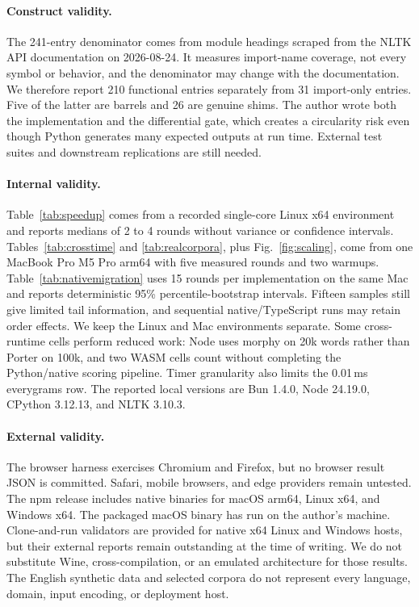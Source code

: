 \documentclass[pdflatex,sn-mathphys-num]{sn-jnl}
\theoremstyle{thmstyleone}
\begin{document}
\paragraph{Construct validity.}
The 241-entry denominator comes from module headings scraped from the NLTK API documentation on 2026-08-24. It measures import-name coverage, not every symbol or behavior, and the denominator may change with the documentation. We therefore report 210 functional entries separately from 31 import-only entries. Five of the latter are barrels and 26 are genuine shims. The author wrote both the implementation and the differential gate, which creates a circularity risk even though Python generates many expected outputs at run time. External test suites and downstream replications are still needed.

\paragraph{Internal validity.}
Table~\ref{tab:speedup} comes from a recorded single-core Linux x64 environment and reports medians of 2 to 4 rounds without variance or confidence intervals. Tables~\ref{tab:crosstime} and \ref{tab:realcorpora}, plus Fig.~\ref{fig:scaling}, come from one MacBook Pro M5 Pro arm64 with five measured rounds and two warmups. Table~\ref{tab:nativemigration} uses 15 rounds per implementation on the same Mac and reports deterministic 95\% percentile-bootstrap intervals. Fifteen samples still give limited tail information, and sequential native/TypeScript runs may retain order effects. We keep the Linux and Mac environments separate. Some cross-runtime cells perform reduced work: Node uses morphy on 20k words rather than Porter on 100k, and two WASM cells count without completing the Python/native scoring pipeline. Timer granularity also limits the 0.01\,ms everygrams row. The reported local versions are Bun 1.4.0, Node 24.19.0, CPython 3.12.13, and NLTK 3.10.3.

\paragraph{External validity.}
The browser harness exercises Chromium and Firefox, but no browser result JSON is committed. Safari, mobile browsers, and edge providers remain untested. The npm release includes native binaries for macOS arm64, Linux x64, and Windows x64. The packaged macOS binary has run on the author's machine. Clone-and-run validators are provided for native x64 Linux and Windows hosts, but their external reports remain outstanding at the time of writing. We do not substitute Wine, cross-compilation, or an emulated architecture for those results. The English synthetic data and selected corpora do not represent every language, domain, input encoding, or deployment host.
\end{document}
